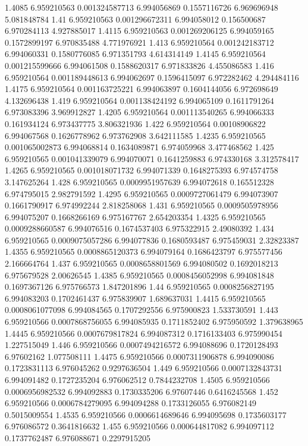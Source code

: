 {1.4085 6.959210563 0.001324587713 6.994056869 0.1557116726 6.969696948 5.081848784
1.41 6.959210563 0.001296672311 6.994058012 0.156500687 6.970284113 4.927885017
1.4115 6.959210563 0.001269206125 6.994059165 0.1572899197 6.970835488 4.771976921
1.413 6.959210564 0.001242183712 6.994060331 0.1580776085 6.971351793 4.614314149
1.4145 6.959210564 0.001215599666 6.994061508 0.1588620317 6.971833826 4.455086583
1.416 6.959210564 0.001189448613 6.994062697 0.1596415097 6.972282462 4.294484116
1.4175 6.959210564 0.001163725221 6.994063897 0.1604144056 6.972698649 4.132696438
1.419 6.959210564 0.001138424192 6.994065109 0.1611791264 6.973083396 3.969912827
1.4205 6.959210564 0.001113540265 6.994066333 0.161934124 6.973437775 3.806321936
1.422 6.959210564 0.00108906822 6.994067568 0.1626778962 6.973762908 3.642111585
1.4235 6.959210565 0.001065002873 6.994068814 0.1634089871 6.974059968 3.477468562
1.425 6.959210565 0.001041339079 6.994070071 0.1641259883 6.974330168 3.312578417
1.4265 6.959210565 0.001018071732 6.994071339 0.1648275393 6.974574758 3.147625264
1.428 6.959210565 0.0009951957639 6.994072618 0.165512328 6.974795015 2.982791592
1.4295 6.959210565 0.0009727061479 6.994073907 0.1661790917 6.974992244 2.818258068
1.431 6.959210565 0.0009505978956 6.994075207 0.1668266169 6.975167767 2.654203354
1.4325 6.959210565 0.0009288660587 6.994076516 0.1674537403 6.975322915 2.49080392
1.434 6.959210565 0.0009075057286 6.994077836 0.1680593487 6.975459031 2.32823387
1.4355 6.959210565 0.0008865120373 6.994079164 0.1686423797 6.975577456 2.166664764
1.437 6.959210565 0.0008658801569 6.994080502 0.1692018213 6.975679528 2.00626545
1.4385 6.959210565 0.0008456052998 6.994081848 0.1697367126 6.975766573 1.847201896
1.44 6.959210565 0.0008256827195 6.994083203 0.1702461437 6.975839907 1.689637031
1.4415 6.959210565 0.0008061077098 6.994084565 0.1707292556 6.975900823 1.533730591
1.443 6.959210566 0.0007868756055 6.994085935 0.1711852402 6.975950592 1.379638965
1.4445 6.959210566 0.0007679817824 6.994087312 0.1716133403 6.975990454 1.227515049
1.446 6.959210566 0.0007494216572 6.994088696 0.1720128493 6.97602162 1.077508111
1.4475 6.959210566 0.0007311906878 6.994090086 0.1723831113 6.976045262 0.9297636504
1.449 6.959210566 0.0007132843731 6.994091482 0.1727235204 6.976062512 0.7844232708
1.4505 6.959210566 0.0006956982532 6.994092883 0.1730335206 6.97607446 0.6416245568
1.452 6.959210566 0.0006784279095 6.994094288 0.1733126055 6.976082149 0.5015009554
1.4535 6.959210566 0.0006614689646 6.994095698 0.1735603177 6.976086572 0.3641816632
1.455 6.959210566 0.000644817082 6.994097112 0.1737762487 6.976088671 0.2297915205
}
